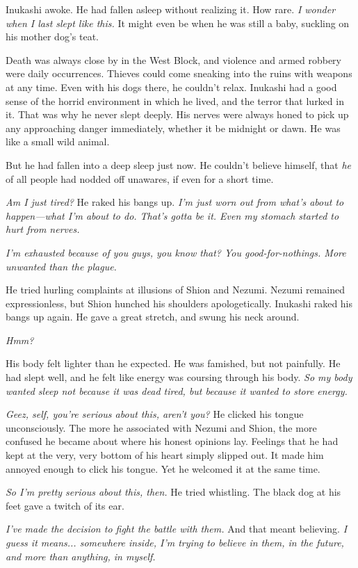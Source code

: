 Inukashi awoke. He had fallen asleep without realizing it. How rare. \emph{I
wonder when I last slept like this.} It might even be when he was still a
baby, suckling on his mother dog's teat.

Death was always close by in the West Block, and violence and armed
robbery were daily occurrences. Thieves could come sneaking into the
ruins with weapons at any time. Even with his dogs there, he couldn't
relax. Inukashi had a good sense of the horrid environment in which he
lived, and the terror that lurked in it. That was why he never slept
deeply. His nerves were always honed to pick up any approaching danger
immediately, whether it be midnight or dawn. He was like a small wild
animal.

But he had fallen into a deep sleep just now. He couldn't believe
himself, that \emph{he} of all people had nodded off unawares, if even for a
short time.

\emph{Am I just tired?} He raked his bangs up. \emph{I'm just worn out from what's
about to happen---what I'm about to do. That's gotta be it. Even my
stomach started to hurt from nerves.}

\emph{I'm exhausted because of you guys, you know that? You good-for-nothings.
More unwanted than the plague.}

He tried hurling complaints at illusions of Shion and Nezumi. Nezumi
remained expressionless, but Shion hunched his shoulders apologetically.
Inukashi raked his bangs up again. He gave a great stretch, and swung
his neck around.

\emph{Hmm?}

His body felt lighter than he expected. He was famished, but not
painfully. He had slept well, and he felt like energy was coursing
through his body. \emph{So my body wanted sleep not because it was dead tired,
but because it wanted to store energy.}

\emph{Geez, self, you're serious about this, aren't you?} He clicked his tongue
unconsciously. The more he associated with Nezumi and Shion, the more
confused he became about where his honest opinions lay. Feelings that he
had kept at the very, very bottom of his heart simply slipped out. It
made him annoyed enough to click his tongue. Yet he welcomed it at the
same time.

\emph{So I'm pretty serious about this, then.} He tried whistling. The black
dog at his feet gave a twitch of its ear.

\emph{I've made the decision to fight the battle with them.} And that meant
believing. \emph{I guess it means... somewhere inside, I'm trying to believe
in them, in the future, and more than anything, in myself.}

